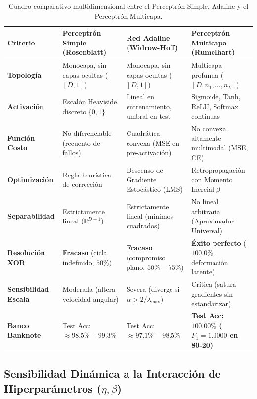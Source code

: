 \documentclass[11pt,letterpaper]{article}
\begin{document}
\begin{table}[htbp]
\centering
\small
\caption{Cuadro comparativo multidimensional entre el Perceptrón Simple, Adaline y el Perceptrón Multicapa.}
\label{tab:cuadro_comparativo_global}
\begin{adjustbox}{max width=\textwidth}
\begin{tabularx}{\textwidth}{p{3.0cm} L L L}
\toprule
\textbf{Criterio} & \textbf{Perceptrón Simple (Rosenblatt)} & \textbf{Red Adaline (Widrow-Hoff)} & \textbf{Perceptrón Multicapa (Rumelhart)} \\
\midrule
\textbf{Topología} & Monocapa, sin capas ocultas ($[D, 1]$) & Monocapa, sin capas ocultas ($[D, 1]$) & Multicapa profunda ($[D, n_1, \dots, n_L]$) \\
\textbf{Activación} & Escalón Heaviside discreto $\{0, 1\}$ & Lineal en entrenamiento, umbral en test & Sigmoide, Tanh, ReLU, Softmax continuas \\
\textbf{Función Costo} & No diferenciable (recuento de fallos) & Cuadrática convexa (MSE en pre-activación) & No convexa altamente multimodal (MSE, CE) \\
\textbf{Optimización} & Regla heurística de corrección & Descenso de Gradiente Estocástico (LMS) & Retropropagación con Momento Inercial $\beta$ \\
\textbf{Separabilidad} & Estrictamente lineal ($\mathbb{R}^{D-1}$) & Estrictamente lineal (mínimos cuadrados) & No lineal arbitraria (Aproximador Universal) \\
\textbf{Resolución XOR} & \textbf{Fracaso} (cicla indefinido, $50\%$) & \textbf{Fracaso} (compromiso plano, $50\%-75\%$) & \textbf{Éxito perfecto} ($100.0\%$, deformación latente) \\
\textbf{Sensibilidad Escala} & Moderada (altera velocidad angular) & Severa (diverge si $\alpha > 2/\lambda_{\max}$) & Crítica (satura gradientes sin estandarizar) \\
\textbf{Banco Banknote} & Test Acc: $\approx 98.5\% - 99.3\%$ & Test Acc: $\approx 97.1\% - 98.5\%$ & \textbf{Test Acc: $100.00\%$ ($F_1 = 1.0000$ en 80-20)} \\
\bottomrule
\end{tabularx}
\end{adjustbox}
\end{table}

\subsection{Sensibilidad Dinámica a la Interacción de Hiperparámetros ($\eta, \beta$)}
\end{document}
